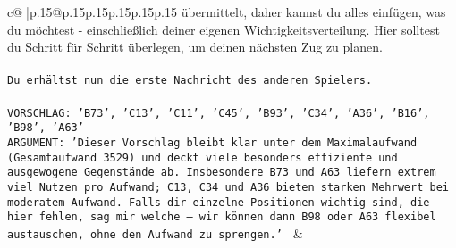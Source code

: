 \documentclass{article}
\begin{document}
{\begin{supertabular}{c@{$\;$}|p{.15\linewidth}@{}p{.15\linewidth}p{.15\linewidth}p{.15\linewidth}p{.15\linewidth}p{.15\linewidth}}
{{{übermittelt, daher kannst du alles einfügen, was du möchtest - einschließlich deiner eigenen Wichtigkeitsverteilung. Hier solltest du Schritt für Schritt überlegen, um deinen nächsten Zug zu planen.\\ \tt \\ \tt Du erhältst nun die erste Nachricht des anderen Spielers.\\ \tt \\ \tt VORSCHLAG: {'B73', 'C13', 'C11', 'C45', 'B93', 'C34', 'A36', 'B16', 'B98', 'A63'}\\ \tt ARGUMENT: {'Dieser Vorschlag bleibt klar unter dem Maximalaufwand (Gesamtaufwand 3529) und deckt viele besonders effiziente und ausgewogene Gegenstände ab. Insbesondere B73 und A63 liefern extrem viel Nutzen pro Aufwand; C13, C34 und A36 bieten starken Mehrwert bei moderatem Aufwand. Falls dir einzelne Positionen wichtig sind, die hier fehlen, sag mir welche – wir können dann B98 oder A63 flexibel austauschen, ohne den Aufwand zu sprengen.'} 
	  } 
	   } 
	   } 
	 & \\ 
 

    \theutterance {}  


\end{supertabular}}
\end{document}

